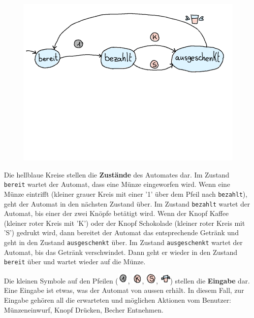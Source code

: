 \documentclass{article}
\begin{document}
\begin{figure}[H]
\centering
\includegraphics[width=0.7\linewidth]{Pictures/Getraenkeautomat1.png}
\end{figure}

Die hellblaue Kreise stellen die \textbf{Zustände} des Automates dar. Im Zustand \texttt{bereit} wartet der Automat, dass eine Münze eingeworfen wird. Wenn eine Münze eintrifft (kleiner grauer Kreis mit einer '1' über dem Pfeil nach \texttt{bezahlt}), geht der Automat in den nächsten Zustand über. Im Zustand \texttt{bezahlt} wartet der Automat, bis einer der zwei Knöpfe betätigt wird. Wenn der Knopf Kaffee (kleiner roter Kreis mit 'K') oder der Knopf Schokolade (kleiner roter Kreis mit 'S') gedrukt wird, dann bereitet der Automat das entsprechende Getränk und geht in den Zustand \texttt{ausgeschenkt} über. Im Zustand \texttt{ausgeschenkt} wartet der Automat, bis das Getränk verschwindet. Dann geht er wieder in den Zustand \texttt{bereit} über und wartet wieder auf die Münze.

Die kleinen Symbole auf den Pfeilen (\includegraphics[width=20px]{Pictures/Muenze.png}, \includegraphics[width=20px]{Pictures/Kaffee.png}, \includegraphics[width=20px]{Pictures/Schoggi.png}, \includegraphics[width=20px]{Pictures/Becher.png}) stellen die \textbf{Eingabe} dar. Eine Eingabe ist etwas, was der Automat von aussen erhält. In diesem Fall, zur Eingabe gehören all die erwarteten und möglichen Aktionen vom Benutzer: Münzeneinwurf, Knopf Drücken, Becher Entnehmen.
\end{document}
